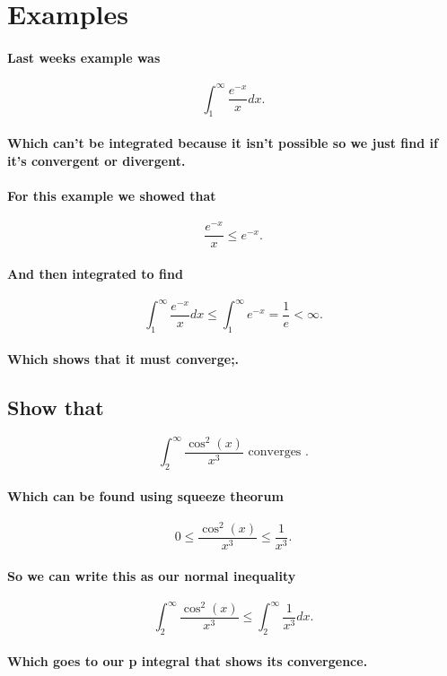 \documentclass[a4paper]{article}
\begin{document}
\section{Examples}%
\label{sec:Examples}
\paragraph{Last weeks example was}

\[
\int_{1}^{\infty} \frac{e^{-x}}{x}dx
.\] 
\paragraph{Which can't be integrated because it isn't possible so we just find if it's convergent or divergent. }
\newpage
\paragraph{For this example we showed that }
\[
\frac{e^{-x}}{x}\le e^{-x}
.\] 
\paragraph{And then integrated to find}
\[
\int_{1}^{\infty} \frac{e^{-x}}{x}dx \le \int_{1}^{\infty} e^{-x}=\frac{1}{e}<\infty
.\] 
\paragraph{Which shows that it must converge;.}

\subsection{Show that}%
\label{sub:Show that}
\[
\int_{2}^{\infty} \frac{\cos^{2}(x)}{x^3} \text{ converges }
.\] 
\paragraph{Which can be found using squeeze theorum}
\[
0\le \frac{\cos^{2}(x)}{x^3}\le \frac{1}{x^3}
.\] 
\paragraph{So we can write this as our normal inequality}
\[
\int_{2}^{\infty} \frac{\cos^{2}(x)}{x^3}\le \int_{2}^{\infty} \frac{1}{x^3}dx
.\] 
\paragraph{Which goes to our p integral that shows its convergence.}
\end{document}
